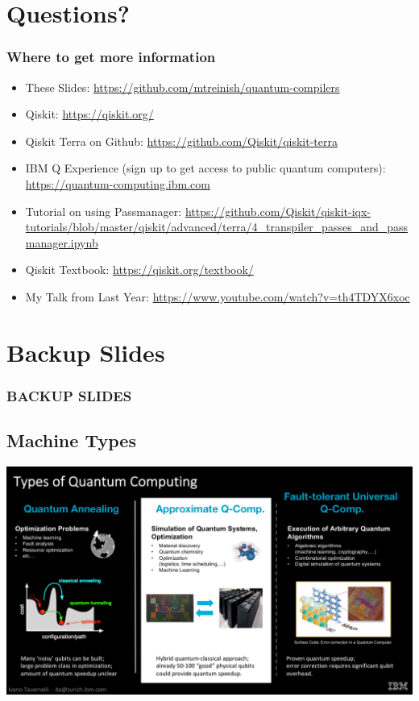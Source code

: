 \documentclass[aspectratio=169,11pt,hyperref={colorlinks=true}]{beamer}
\begin{document}
\section{Questions?}
\begin{frame}
\frametitle{Where to get more information}
    \begin{itemize}
        \item These Slides: \href{https://github.com/mtreinish/quantum-compilers}{https://github.com/mtreinish/quantum-compilers}
        \item Qiskit: \href{https://qiskit.org/}{https://qiskit.org/}
        \item Qiskit Terra on Github: \href{https://github.com/Qiskit/qiskit-terra}{https://github.com/Qiskit/qiskit-terra}
        \item IBM Q Experience (sign up to get access to public quantum computers): \href{https://quantum-computing.ibm.com}{https://quantum-computing.ibm.com}
        \item Tutorial on using Passmanager: {\small \href{https://github.com/Qiskit/qiskit-iqx-tutorials/blob/master/qiskit/advanced/terra/4\_transpiler\_passes\_and\_passmanager.ipynb}{https://github.com/Qiskit/qiskit-iqx-tutorials/blob/master/qiskit/advanced/terra/4\_transpiler\_passes\_and\_passmanager.ipynb}}
        \item Qiskit Textbook: \href{https://qiskit.org/textbook/}{https://qiskit.org/textbook/}
        \item My Talk from Last Year: \href{https://www.youtube.com/watch?v=th4TDYX6xoc}{https://www.youtube.com/watch?v=th4TDYX6xoc}
    \end{itemize}
\end{frame}

\section{Backup Slides}
\begin{frame}[noframenumbering]
    \frametitle{BACKUP SLIDES}
\end{frame}

\subsection{Machine Types}
    \begin{frame}[noframenumbering]
        \includegraphics[width=\textwidth]{machine_types.png}
\end{frame}
\end{document}

